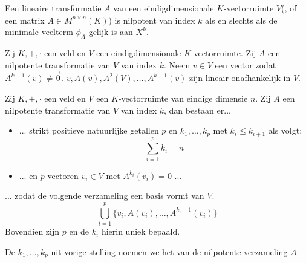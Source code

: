 \documentclass[main.tex]{subfiles}
\begin{document}
\begin{ei}
  Een lineaire transformatie $A$ van een eindigdimensionale $K$-vectorruimte $V$(, of een matrix $A\in M^{n\times n}(K)$) is nilpotent van index $k$ als en slechts als de minimale veelterm $\phi_{A}$ gelijk is aan $X^{k}$.
\end{ei}

\begin{ei}
  \examen
  Zij $K,+,\cdot$ een veld en $V$ een eindigdimensionale $K$-vectorruimte.
  Zij $A$ een nilpotente transformatie van $V$ van index $k$.
  Neem $v\in V$ een vector zodat $A^{k-1}(v) \neq \vec{0}$.
  $v, A(v), A^{2}(V), \dotsc, A^{k-1}(v)$ zijn lineair onafhankelijk in $V$.
\end{ei}

\begin{st}
  Zij $K,+,\cdot$ een veld en $V$ een $K$-vectorruimte van eindige dimensie $n$.
  Zij $A$ een nilpotente transformatie van $V$ van index $k$, dan bestaan er...
  \begin{itemize}
  \item ... strikt positieve natuurlijke getallen $p$ en $k_{1}, \dotsc, k_{p}$ met $k_{i} \le k_{i+1}$ als volgt:
    \[ \sum_{i=1}^{p}k_{i} = n \]
  \item ...  en $p$ vectoren $v_{i}\in V$ met $A^{k_{i}}(v_{i}) = 0$ ...
  \end{itemize}
  ... zodat de volgende verzameling een basis vormt van $V$.
  \[ \bigcup_{i=1}^{p} \{ v_{i}, A(v_{i}), \dotsc, A^{k_{i}-1}(v_{i}) \} \]
  Bovendien zijn $p$ en de $k_{i}$ hierin uniek bepaald.
\end{st}

\begin{de}
  De $k_{1}, \dotsc, k_{p}$ uit vorige stelling noemen we het  van de nilpotente verzameling $A$.
\end{de}
\end{document}
